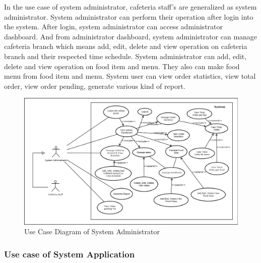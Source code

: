 In the use case of system administrator, cafeteria staff's are generalized as
system administrator.
System administrator can perform their operation after login into the system.
After login, system administrator can access administrator dashboard. And from
administrator dashboard, system administrator can manage cafeteria branch which
means add, edit, delete and view operation on cafeteria branch and their
respected time schedule. System administrator can add, edit, delete and view
operation on food item and menu.
They also can make food menu from food item and menu. System user can view order
statistics, view total order, view order pending, generate various kind of
report.
\begin{landscape}
\begin{figure}[h!t]
    \centering
      \includegraphics[width=9in]{ch3/UseCase/SystemAdministrator}
  \caption{Use Case Diagram of System Administrator}
  \label{UCSystemAdministrator}
\end{figure}
\end{landscape}

\subsubsection{Use case of System Application}

